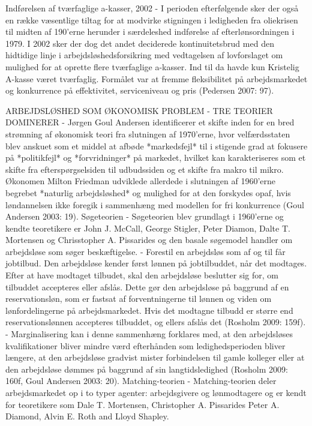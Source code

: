 Indførelsen af tværfaglige a-kasser, 2002 
- I perioden efterfølgende sker der også en række væsentlige tiltag for at modvirke stigningen i ledigheden fra oliekrisen til midten af 190'erne herunder i særdeleshed indførelse af efterlønsordningen i 1979. I 2002 sker der dog det andet deciderede kontinuitetsbrud med den hidtidige linje i arbejdsløshedsforsikring med vedtagelsen af lovforslaget om mulighed for at oprette flere tværfaglige a-kasser. Ind til da havde kun Kristelig A-kasse været tværfaglig. Formålet var at fremme fleksibilitet på arbejdsmarkedet og konkurrence på effektivitet, serviceniveau og pris (Pedersen 2007: 97).

ARBEJDSLØSHED SOM ØKONOMISK PROBLEM - TRE TEORIER DOMINERER
- Jørgen Goul Andersen identificerer et skifte inden for en bred strømning af økonomisk teori fra slutningen af 1970'erne, hvor velfærdsstaten blev anskuet som et middel at afbøde *markedsfejl* til i stigende grad at fokusere på *politikfejl* og *forvridninger* på markedet, hvilket kan karakteriseres som et skifte fra efterspørgselsiden til udbudssiden og et skifte fra makro til mikro. Økonomen Milton Friedman udviklede allerdede i slutningen af 1960'erne begrebet *naturlig arbejdsløshed* og mulighed for at den forskydes opaf, hvis løndannelsen ikke foregik i sammenhæng med modellen for fri konkurrence (Goul Andersen 2003: 19).
Søgeteorien
- Søgeteorien blev grundlagt i 1960'erne og kendte teoretikere er John J. McCall, George Stigler, Peter Diamon, Dalte T. Mortensen og Chrisstopher A. Pissarides og den basale søgemodel handler om arbejdsløse som søger beskæftigelse.
- Forestil en arbejdsløs som af og til  får jobtilbud. Den arbejdsløse kender først lønnen på jobtilbuddet, når det modtages. Efter at have modtaget tilbudet, skal den arbejdsløse beslutter sig for, om tilbuddet accepteres eller afslås. Dette gør den arbejdsløse på baggrund af en reservationsløn, som er fastsat af forventningerne til lønnen og viden om lønfordelingerne på  arbejdsmarkedet. Hvis det modtagne tilbudd er større end reservationslønnen accepteres tilbuddet, og ellers afslås det (Rosholm 2009: 159f).
- Marginalisering kan i denne sammenhæng forklares med, at den arbejdsløses kvalifikationer bliver mindre værd efterhånden som ledighedsperioden bliver længere, at den arbejdsløse gradvist mister forbindelsen til gamle kolleger eller at den arbejdsløse dømmes på baggrund af sin langtidsledighed (Rosholm 2009: 160f, Goul Andersen 2003: 20).
Matching-teorien
- Matching-teorien deler arbejdsmarkedet op i to typer agenter: arbejdsgivere og lønmodtagere og er kendt for teoretikere som Dale T. Mortensen, Christopher A. Pissarides Peter A. Diamond, Alvin E. Roth and Lloyd Shapley.
